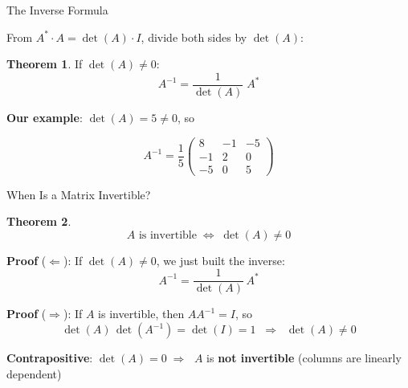 \documentclass[10pt]{beamer}
\theoremstyle{definition}
\newtheorem{thm}{Theorem}[section]
\newcommand{\x}[1]{\alert{\textbf{#1}}}
\begin{document}
\begin{frame}{The Inverse Formula}

From $A^* \cdot A = \det(A) \cdot I$, divide both sides by $\det(A)$:

\vfill

\begin{thm}
If $\det(A) \neq 0$:
$$\boxed{A^{-1} = \frac{1}{\det(A)}\; A^*}$$
\end{thm}

\vfill

\textbf{Our example}: $\det(A) = 5 \neq 0$, so

$$A^{-1} = \frac{1}{5}\begin{pmatrix} 8 & -1 & -5 \\ -1 & 2 & 0 \\ -5 & 0 & 5\end{pmatrix}$$

\end{frame}


\begin{frame}{When Is a Matrix Invertible?}

\begin{thm}
$$\boxed{A \text{ is invertible} \;\Longleftrightarrow\; \det(A) \neq 0}$$
\end{thm}

\vfill

\textbf{Proof} ($\Leftarrow$): \; If $\det(A)\neq 0$, we just built the inverse:
$$A^{-1} = \frac{1}{\det(A)}\, A^*$$

\vfill

\textbf{Proof} ($\Rightarrow$): \; If $A$ is invertible, then $AA^{-1} = I$, so
$$\det(A)\,\det(A^{-1}) = \det(I) = 1 \;\;\Longrightarrow\;\; \det(A) \neq 0$$

\vfill

\textbf{Contrapositive}: \; $\det(A) = 0 \;\Longrightarrow\;$ $A$ is \x{not invertible} (columns are linearly dependent)

\end{frame}
\end{document}

